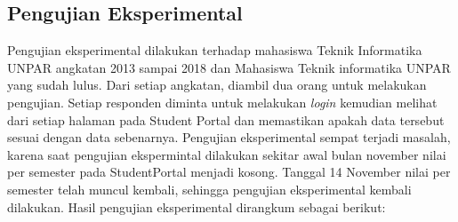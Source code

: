 \subsection{Pengujian Eksperimental}
Pengujian eksperimental dilakukan terhadap mahasiswa Teknik Informatika UNPAR angkatan 2013 sampai 2018 dan Mahasiswa Teknik informatika UNPAR yang sudah lulus. Dari setiap angkatan, diambil dua orang untuk melakukan pengujian. Setiap responden diminta untuk melakukan \textit{login} kemudian melihat dari setiap halaman pada Student Portal dan memastikan apakah data tersebut sesuai dengan data sebenarnya. Pengujian eksperimental sempat terjadi masalah, karena saat pengujian ekspermintal dilakukan sekitar awal bulan november nilai per semester pada StudentPortal menjadi kosong. Tanggal 14 November nilai per semester telah muncul kembali, sehingga pengujian eksperimental kembali dilakukan.
Hasil pengujian eksperimental dirangkum sebagai berikut:
